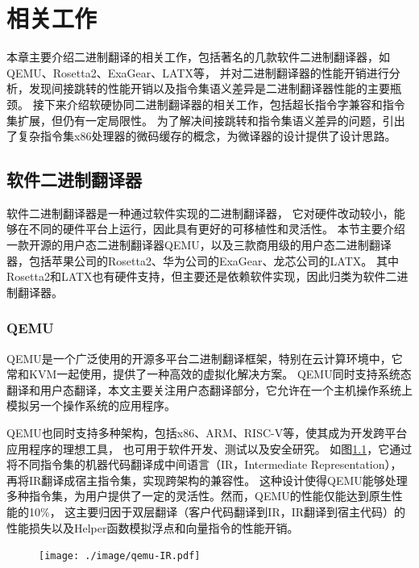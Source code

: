 \chapter{相关工作}\label{chap:related_work}

本章主要介绍二进制翻译的相关工作，包括著名的几款软件二进制翻译器，如QEMU、Rosetta2、ExaGear、LATX等，
并对二进制翻译器的性能开销进行分析，发现间接跳转的性能开销以及指令集语义差异是二进制翻译器性能的主要瓶颈。
接下来介绍软硬协同二进制翻译器的相关工作，包括超长指令字兼容和指令集扩展，但仍有一定局限性。
为了解决间接跳转和指令集语义差异的问题，引出了复杂指令集x86处理器的微码缓存的概念，为微译器的设计提供了设计思路。

\section{软件二进制翻译器}

软件二进制翻译器是一种通过软件实现的二进制翻译器，
它对硬件改动较小，能够在不同的硬件平台上运行，因此具有更好的可移植性和灵活性。
本节主要介绍一款开源的用户态二进制翻译器QEMU，以及三款商用级的用户态二进制翻译器，包括苹果公司的Rosetta2、华为公司的ExaGear、龙芯公司的LATX。
其中Rosetta2和LATX也有硬件支持，但主要还是依赖软件实现，因此归类为软件二进制翻译器。

\subsection{QEMU}

QEMU是一个广泛使用的开源多平台二进制翻译框架，特别在云计算环境中，它常和KVM一起使用，提供了一种高效的虚拟化解决方案。
QEMU同时支持系统态翻译和用户态翻译，本文主要关注用户态翻译部分，它允许在一个主机操作系统上模拟另一个操作系统的应用程序。

QEMU也同时支持多种架构，包括x86、ARM、RISC-V等，使其成为开发跨平台应用程序的理想工具， 也可用于软件开发、测试以及安全研究。
如图\ref{img:qemu_arch}，它通过将不同指令集的机器代码翻译成中间语言（IR，Intermediate Representation），再将IR翻译成宿主指令集，实现跨架构的兼容性。
这种设计使得QEMU能够处理多种指令集，为用户提供了一定的灵活性。然而，QEMU的性能仅能达到原生性能的10\%，
这主要归因于双层翻译（客户代码翻译到IR，IR翻译到宿主代码）的性能损失以及Helper函数模拟浮点和向量指令的性能开销\cite{deflater}。

\begin{figure}[!htbp]
  \centering
  \texttt{[image: ./image/qemu-IR.pdf]}
  \label{img:qemu_arch}
\end{figure}

